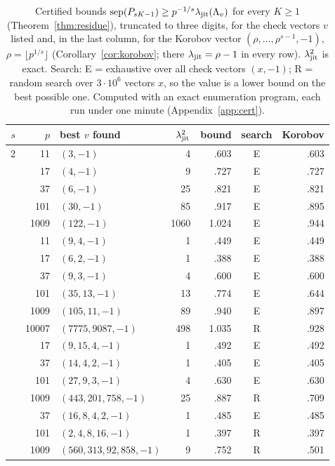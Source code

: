 \begin{table}[t]
\centering
\small
\caption{Certified bounds $\operatorname{sep}(P_{sK-1})\ge p^{-1/s}\lambda_{\mathrm{jit}}(\Lambda_v)$ for every $K\ge1$ (Theorem~\ref{thm:residue}), truncated to three digits, for the check vectors $v$ listed and, in the last column, for the Korobov vector $(\rho,\dots,\rho^{s-1},-1)$, $\rho=\lfloor p^{1/s}\rfloor$ (Corollary~\ref{cor:korobov}; there $\lambda_{\mathrm{jit}}=\rho-1$ in every row). $\lambda_{\mathrm{jit}}^2$ is exact. Search: E = exhaustive over all check vectors $(x,-1)$; R = random search over $3\cdot10^6$ vectors $x$, so the value is a lower bound on the best possible one. Computed with an exact enumeration program, each run under one minute (Appendix~\ref{app:cert}).}
\label{tab:residue}
\begin{tabular}{@{}rr l r r c r@{}}
\toprule
$s$ & $p$ & best $v$ found & $\lambda_{\mathrm{jit}}^2$ & bound & search & Korobov\\
\midrule
2 & 11 & $(3,-1)$ & 4 & .603 & E & .603\\
 & 17 & $(4,-1)$ & 9 & .727 & E & .727\\
 & 37 & $(6,-1)$ & 25 & .821 & E & .821\\
 & 101 & $(30,-1)$ & 85 & .917 & E & .895\\
 & 1009 & $(122,-1)$ & 1060 & 1.024 & E & .944\\
\addlinespace
3 & 11 & $(9,4,-1)$ & 1 & .449 & E & .449\\
 & 17 & $(6,2,-1)$ & 1 & .388 & E & .388\\
 & 37 & $(9,3,-1)$ & 4 & .600 & E & .600\\
 & 101 & $(35,13,-1)$ & 13 & .774 & E & .644\\
 & 1009 & $(105,11,-1)$ & 89 & .940 & E & .897\\
 & 10007 & $(7775,9087,-1)$ & 498 & 1.035 & R & .928\\
\addlinespace
4 & 17 & $(9,15,4,-1)$ & 1 & .492 & E & .492\\
 & 37 & $(14,4,2,-1)$ & 1 & .405 & E & .405\\
 & 101 & $(27,9,3,-1)$ & 4 & .630 & E & .630\\
 & 1009 & $(443,201,758,-1)$ & 25 & .887 & R & .709\\
\addlinespace
5 & 37 & $(16,8,4,2,-1)$ & 1 & .485 & E & .485\\
 & 101 & $(2,4,8,16,-1)$ & 1 & .397 & R & .397\\
 & 1009 & $(560,313,92,858,-1)$ & 9 & .752 & R & .501\\
\bottomrule
\end{tabular}
\end{table}

